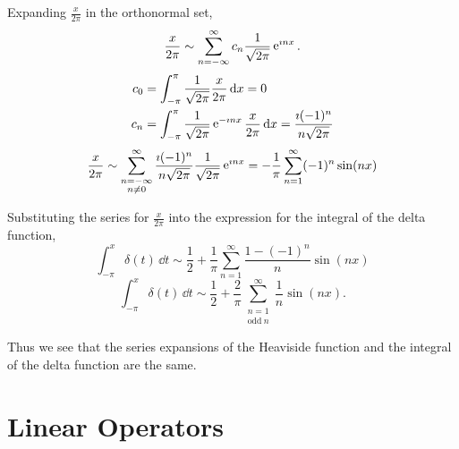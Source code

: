 \begin{Example}
  Expanding $\frac{x}{2\pi}$ in the orthonormal set,
  \[ \frac{x}{2\pi} \sim \sum_{n = -\infty}^\infty c_n \frac{1}{\sqrt{2\pi}} \mathop{\mathrm{e}}\nolimits^{\imath n x}.\]
  \begin{align*}
    c_0     &= \int_{-\pi}^\pi \frac{1}{\sqrt{2\pi}} \frac{x}{2\pi}\,\mathrm{d} x = 0 \\
    c_n     &= \int_{-\pi}^\pi \frac{1}{\sqrt{2\pi}} \mathop{\mathrm{e}}\nolimits^{- \imath n x} 
    \frac{x}{2\pi}\,\mathrm{d} x = \frac{\imath (-1)^n}{n \sqrt{2\pi}}
  \end{align*}
  \[
  \frac{x}{2\pi} \sim \sum_{\substack{ n=-\infty \\ n \neq 0 }}^\infty
  \frac{\imath (-1)^n}{n \sqrt{2\pi}} \frac{1}{\sqrt{2\pi}} \mathop{\mathrm{e}}\nolimits^{\imath n x} 
  = -\frac{1}{\pi} \sum_{n = 1}^\infty (-1)^n \sin(n x)
  \]

  Substituting the series for $\frac{x}{2\pi}$ into the expression for
  the integral of the delta function,
  \[ \int_{-\pi}^x \delta(t)\,\dd t \sim \frac{1}{2} + \frac{1}{\pi} 
  \sum_{n = 1}^\infty \frac{1-(-1)^n}{n} \sin(n x) \]
  \[ \boxed{ \int_{-\pi}^x \delta(t)\,\dd t \sim \frac{1}{2} 
    + \frac{2}{\pi} \sum_{\substack{ {n} = 1 \\ \mathrm{odd}\ n}}^{\infty} \frac{1}{n}\sin(n x).} \]




  Thus we see that the series expansions of the Heaviside function and
  the integral of the delta function are the same.
\end{Example}






\section{Linear Operators}














